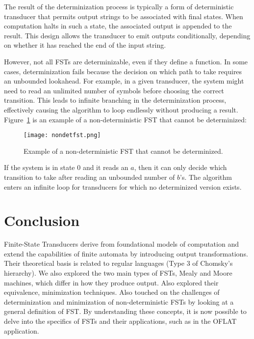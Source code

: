 The result of the determinization process is typically a form of deterministic transducer that permits output strings to be associated with final states. 
When computation halts in such a state, the associated output is appended to the result. 
This design allows the transducer to emit outputs conditionally, depending on whether it has reached the end of the input string.

However, not all FSTs are determinizable, even if they define a function. 
In some cases, determinization fails because the decision on which path to take requires an unbounded lookahead. 
For example, in a given transducer, the system might need to read an unlimited number of symbols before choosing the correct transition. 
This leads to infinite branching in the determinization process, effectively causing the algorithm to loop endlessly without producing a result. 
Figure~\ref{nondetfst} is an example of a non-deterministic FST that cannot be determinized: \cite{vannoord1997fst}

\begin{figure}[htbp]
    \centering
    \texttt{[image: nondetfst.png]}
    \caption{Example of a non-deterministic FST that cannot be determinized.}
    \label{nondetfst}
\end{figure}

If the system is in state $0$ and it reads an $a$, then it can only decide which transition to take after reading an unbounded number of $b$'s. 
The algorithm enters an infinite loop for transducers for which no determinized version exists.


\section{Conclusion}

Finite-State Transducers derive from foundational models of computation and extend the capabilities of finite automata by introducing output transformations. 
Their theoretical basis is related to regular languages (Type 3 of Chomsky's hierarchy). We also explored the two main types of FSTs, Mealy and Moore machines,
which differ in how they produce output. Also explored their equivalence, minimization techniques. Also touched on the challenges of determinization and minimization of non-deterministic FSTs
by looking at a general definition of FST.
By understanding these concepts, it is now possible to delve into the specifics of FSTs and their applications, such as in the OFLAT application.


